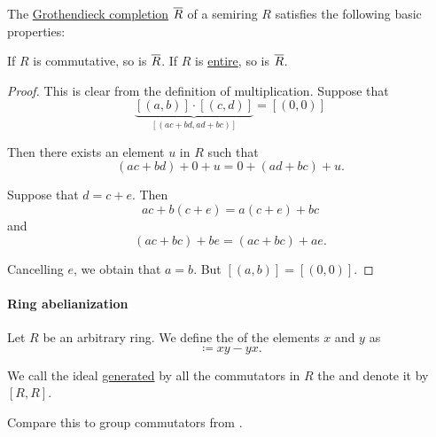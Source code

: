 \begin{proposition}\label{thm:def:grothendieck_semiring_completion}
  The \hyperref[thm:grothendieck_semiring_completion]{Grothendieck completion} \( \oline{R} \) of a semiring \( R \) satisfies the following basic properties:
  \begin{thmenum}
     If \( R \) is commutative, so is \( \oline{R} \).
     If \( R \) is \hyperref[def:entire_semiring]{entire}, so is \( \oline{R} \).
  \end{thmenum}
\end{proposition}
\begin{proof}
   This is clear from the definition of multiplication.
   Suppose that
  \begin{equation*}
    \underbrace{[(a, b)] \cdot [(c, d)]}_{[(ac + bd, ad + bc)]} = [(0, 0)]
  \end{equation*}

  Then there exists an element \( u \) in \( R \) such that
  \begin{equation*}
    (ac + bd) + 0 + u = 0 + (ad + bc) + u.
  \end{equation*}

  Suppose that \( d = c + e \). Then
  \begin{equation*}
    ac + b(c + e) = a(c + e) + bc
  \end{equation*}
  and
  \begin{equation*}
    (ac + bc) + be = (ac + bc) + ae.
  \end{equation*}

  Cancelling \( e \), we obtain that \( a = b \). But \( [(a, b)] = [(0, 0)] \).
\end{proof}

\paragraph{Ring abelianization}

\begin{definition}\label{def:ring_commutator}\mimprovised
  Let \( R \) be an arbitrary ring. We define the  of the elements \( x \) and \( y \) as
  \begin{equation*}
    [x, y] \coloneqq xy - yx.
  \end{equation*}

  We call the ideal \hyperref[def:semiring_ideal/generated]{generated} by all the commutators in \( R \) the  and denote it by \( [R, R] \).
\end{definition}
\begin{comments}
  \item Compare this to group commutators from .
\end{comments}

